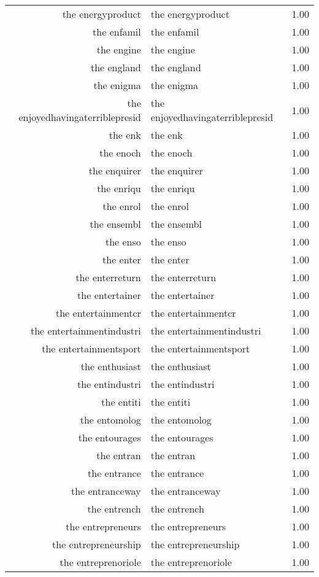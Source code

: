 \begin{table}[ht]
\begin{tabular}{rlr}
  the energyproduct & the energyproduct & 1.00 \\ 
  the enfamil & the enfamil & 1.00 \\ 
  the engine & the engine & 1.00 \\ 
  the england & the england & 1.00 \\ 
  the enigma & the enigma & 1.00 \\ 
  the enjoyedhavingaterriblepresid & the enjoyedhavingaterriblepresid & 1.00 \\ 
  the enk & the enk & 1.00 \\ 
  the enoch & the enoch & 1.00 \\ 
  the enquirer & the enquirer & 1.00 \\ 
  the enriqu & the enriqu & 1.00 \\ 
  the enrol & the enrol & 1.00 \\ 
  the ensembl & the ensembl & 1.00 \\ 
  the enso & the enso & 1.00 \\ 
  the enter & the enter & 1.00 \\ 
  the enterreturn & the enterreturn & 1.00 \\ 
  the entertainer & the entertainer & 1.00 \\ 
  the entertainmentcr & the entertainmentcr & 1.00 \\ 
  the entertainmentindustri & the entertainmentindustri & 1.00 \\ 
  the entertainmentsport & the entertainmentsport & 1.00 \\ 
  the enthusiast & the enthusiast & 1.00 \\ 
  the entindustri & the entindustri & 1.00 \\ 
  the entiti & the entiti & 1.00 \\ 
  the entomolog & the entomolog & 1.00 \\ 
  the entourages & the entourages & 1.00 \\ 
  the entran & the entran & 1.00 \\ 
  the entrance & the entrance & 1.00 \\ 
  the entranceway & the entranceway & 1.00 \\ 
  the entrench & the entrench & 1.00 \\ 
  the entrepreneurs & the entrepreneurs & 1.00 \\ 
  the entrepreneurship & the entrepreneurship & 1.00 \\ 
  the entreprenoriole & the entreprenoriole & 1.00 \\ 

\end{tabular}
\end{table}
